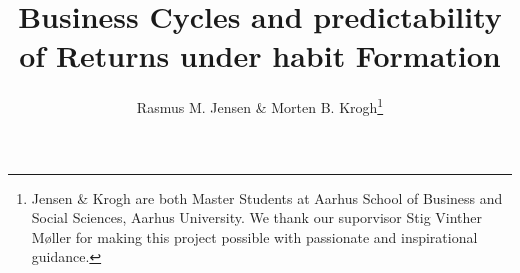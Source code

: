 

\usepackage{booktabs}



\onehalfspacing      %

\author{Rasmus M. Jensen \& Morten B. Krogh\thanks{\rm Jensen \& Krogh are both Master Students at Aarhus School of Business and Social Sciences, Aarhus University. We thank our suporvisor Stig Vinther Møller for making this project possible with passionate and inspirational guidance.}}

\title{\Large \bf Business Cycles and predictability of Returns under habit Formation}

\date{}              %


\maketitle
\thispagestyle{empty}



\clearpage


% 




\clearpage

\begin{doublespacing}   %


\end{doublespacing}



\clearpage

\renewcommand{\enotesize}{\normalsize}


\appendix



\clearpage


